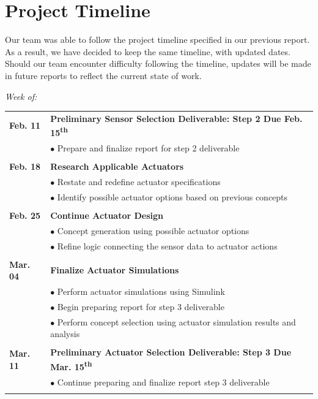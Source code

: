 \documentclass[12pt]{article}
\newcommand{\ts}{\textsuperscript}
\begin{document}
\clearpage
\section{Project Timeline}
Our team was able to follow the project timeline specified in our previous report. As a result, we have decided to keep the same timeline, with updated dates. Should our team encounter difficulty following the timeline, updates will be made in future reports to reflect the current state of work.\\
\begin{flushleft}
\textit{Week of:}

\begin{tabular}{l | l}


 
\textbf{Feb. 11} &\textbf{Preliminary Sensor Selection Deliverable: Step 2 Due Feb. 15\ts{th}}\\
 & $\bullet$ Prepare and finalize report for step 2 deliverable\\\\
 
\textbf{Feb. 18} &\textbf{Research Applicable Actuators}\\
 & $\bullet$ Restate and redefine actuator specifications\\
  & $\bullet$ Identify possible actuator options based on previous concepts\\\\
  
\textbf{Feb. 25} & \textbf{Continue Actuator Design}\\
 & $\bullet$ Concept generation using possible actuator options\\
  & $\bullet$ Refine logic connecting the sensor data to actuator actions\\\\
  
\textbf{Mar. 04} & \textbf{Finalize Actuator Simulations}\\
 & $\bullet$ Perform actuator simulations using Simulink\\
 & $\bullet$ Begin preparing report for step 3 deliverable\\
 & $\bullet$ Perform concept selection using actuator simulation results and analysis\\\\
 
\textbf{Mar. 11} &\textbf{Preliminary Actuator Selection Deliverable: Step 3 Due Mar. 15\ts{th}}\\
 & $\bullet$ Continue preparing and finalize report step 3 deliverable\\\\
 

\end{tabular}
\end{flushleft}
\end{document}
